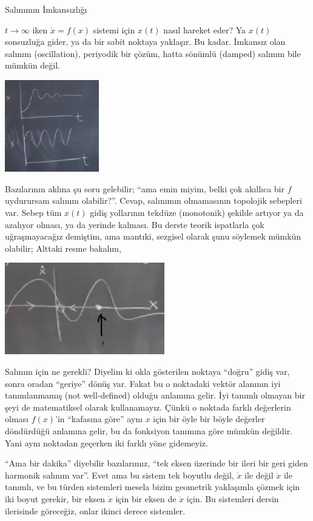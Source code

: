 \documentclass[12pt,fleqn]{article}\usepackage{../../common}
\begin{document}
Salınımın İmkansızlığı

$t \to \infty$ iken $\dot{x} = f(x)$ sistemi için  $x(t)$ nasıl hareket eder? Ya
$x(t)$ sonsuzluğa gider, ya da bir sabit noktaya yaklaşır. Bu kadar. İmkansız
olan salınım (oscillation), periyodik bir çözüm, hatta sönümlü (damped) salınım
bile mümkün değil. 

\includegraphics[height=4cm]{02_07.png}

Bazılarının aklına şu soru gelebilir; ``ama emin miyim, belki çok akıllıca bir
$f$ uydurursam salınım olabilir?''. Cevap, salınımın olmamasının topolojik
sebepleri var.  Sebep tüm $x(t)$ gidiş yollarının tekdüze (monotonik) şekilde
artıyor ya da azalıyor olması, ya da yerinde kalması. Bu derste teorik
ispatlarla çok uğraşmayacağız demiştim, ama mantıki, sezgisel olarak şunu
söylemek mümkün olabilir; Alttaki resme bakalım,

\includegraphics[height=4cm]{02_08.png}

Salınım için ne gerekli? Diyelim ki okla gösterilen noktaya ``doğru'' gidiş var,
sonra oradan ``geriye'' dönüş var. Fakat bu o noktadaki vektör alanının iyi
tanımlanmamış (not well-defined) olduğu anlamına gelir. İyi tanımlı olmayan bir
şeyi de matematiksel olarak kullanamayız. Çünkü o noktada farklı değerlerin
olması $f(x)$'in ``kafasına göre'' aynı $x$ için bir öyle bir böyle değerler
döndürdüğü anlamına gelir, bu da fonksiyon tanımına göre mümkün değildir. Yani
aynı noktadan geçerken iki farklı yöne gidemeyiz.

``Ama bir dakika'' diyebilir bazılarımız, ``tek eksen üzerinde bir ileri bir
geri giden harmonik salınım var''. Evet ama bu sistem tek boyutlu değil,
$\dot{x}$ ile değil $\ddot{x}$ ile tanımlı, ve bu türden sistemleri mesela bizim
geometrik yaklaşımla çözmek için iki boyut gerekir, bir eksen $\dot{x}$ için bir
eksen de $\ddot{x}$ için. Bu sistemleri dersin ilerisinde göreceğiz, onlar
ikinci derece sistemler.
\end{document}
